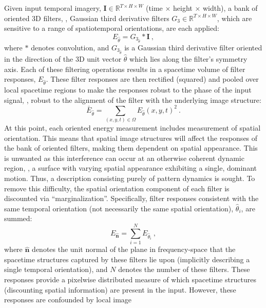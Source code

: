 Given input temporal imagery, $\mathbf{I} \in \mathbb{R}^{T \times H \times W}$ (time $\times$ height $\times$ width), a bank of oriented 3D
filters, \eg, Gaussian third derivative filters $G_3 \in \mathbb{R}^{T \times H \times W}$, which are sensitive to a range of
spatiotemporal orientations, are each applied:
\begin{equation}
	E_{\hat{\theta}} = G_{3_{\hat{\theta}}} \ast \mathbf{I}\ ,
\end{equation}
where $\ast$ denotes convolution, and $G_{3_{\hat{\theta}}}$ is a Gaussian third derivative filter oriented in the direction of the 3D unit vector $\hat{\theta}$ which lies along the filter's symmetry axis. Each of these filtering operations results in a spacetime volume of filter responses, $E_{\hat{\theta}}$.
These filter responses are then rectified (squared) and
pooled over local spacetime regions to make the responses robust
to the phase of the input signal, \ie, robust to the
alignment of the filter with the underlying image
structure:
\begin{equation}
	\bar{E}_{\hat{\theta}} = \sum_{(x, y, t) \in \Omega}{{E_{\hat{\theta}}(x, y, t)}^2}\ .
\end{equation}
At this point, each oriented energy measurement includes measurement of spatial orientation. This means that spatial image structures will affect the responses of the bank of oriented filters, making them dependent on spatial appearance. This is unwanted as this interference can occur at an otherwise coherent dynamic region, \eg, a surface with varying spatial appearance exhibiting a single, dominant motion. Thus, a description consisting purely of pattern dynamics is sought.
To remove this difficulty, the spatial orientation component of each filter is discounted via ``marginalization''. Specifically, filter responses consistent with the same temporal orientation (not necessarily the same spatial orientation), $\hat{\theta}_i$, are summed:
\begin{equation}
	E_{\hat{\mathbf{n}}} = \sum_{i = 1}^{N}{E_{\hat{\theta}_i}}\ ,
	\label{eq:oriented_filter_2.8}
\end{equation}
where $\hat{\mathbf{n}}$ denotes the unit normal of the plane in frequency-space that the spacetime structures captured by these filters lie upon (implicitly describing a single temporal orientation), and $N$ denotes the number of these filters.
These responses provide a pixelwise distributed measure
of which spacetime structures (discounting spatial information) are
present in the input.
However, these responses are confounded by local image
